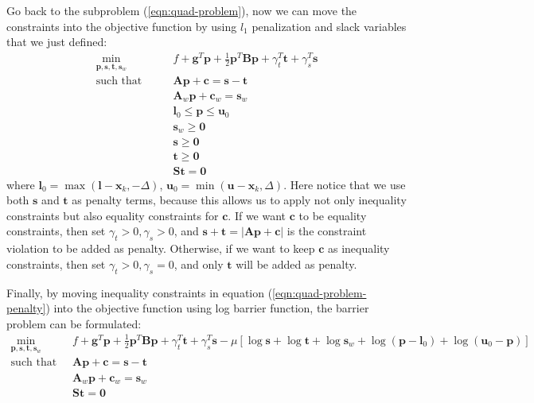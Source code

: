 \documentclass[12pt]{article}
\newcommand{\mb}{\mathbf}
\begin{document}
Go back to the subproblem (\ref{eqn:quad-problem}), now we can move the constraints into the objective function by using $l_1$ penalization and slack variables that we just defined:
%
\begin{equation}
  \label{eqn:quad-problem-penalty}
  \begin{aligned}
    \min_{\mb{p}, \mb{s}, \mb{t}, \mb{s}_w} \qquad & f + \mb{g}^T\mb{p} + \frac{1}{2}\mb{p}^T\mb{B}\mb{p} + \gamma_t^T\mb{t} + \gamma_s^T\mb{s}\\
    \text{such that} \qquad
    & \mb{A}\mb{p} + \mb{c} = \mb{s} - \mb{t} \\
    & \mb{A}_{w}\mb{p} + \mb{c}_{w} = \mb{s}_w \\
    & \mb{l}_0 \le \mb{p} \le \mb{u}_0 \\
    & \mb{s}_w \ge \mb{0} \\
    & \mb{s} \ge \mb{0} \\
    & \mb{t} \ge \mb{0} \\
    & \mb{S} \mb{t} = \mb{0}
  \end{aligned}
\end{equation}
%
where $\mb{l}_0 = \max(\mb{l} - \mb{x}_k, -\Delta)$, $\mb{u}_0 = \min(\mb{u} - \mb{x}_k, \Delta)$. Here notice that we use both $\mb{s}$ and $\mb{t}$ as penalty terms, because this allows us to apply not only inequality constraints but also equality constraints for $\mb{c}$. If we want $\mb{c}$ to be equality constraints, then set $\gamma_t > 0, \gamma_s > 0$, and $\mb{s} + \mb{t} = |\mb{A}\mb{p} + \mb{c}|$ is the constraint violation to be added as penalty. Otherwise, if we want to keep $\mb{c}$ as inequality constraints, then set $\gamma_t > 0, \gamma_s = 0$, and only $\mb{t}$ will be added as penalty.

Finally, by moving inequality constraints in equation (\ref{eqn:quad-problem-penalty}) into the objective function using log barrier function, the barrier problem can be formulated:
%
\begin{equation}
  \label{eqn:quad-problem-barrier}
  \begin{aligned}
    \min_{\mb{p}, \mb{s}, \mb{t}, \mb{s}_w} \qquad & f + \mb{g}^T\mb{p} + \frac{1}{2}\mb{p}^T\mb{B}\mb{p} + \gamma_t^T\mb{t} + \gamma_s^T\mb{s} - \mu \left[ \log \mb{s} + \log \mb{t} + \log \mb{s}_{w} + \log (\mb{p} - \mb{l}_0) + \log (\mb{u}_0 - \mb{p})  \right] \\
    \text{such that} \qquad
    & \mb{A}\mb{p} + \mb{c} = \mb{s} - \mb{t} \\
    & \mb{A}_{w}\mb{p} + \mb{c}_{w} = \mb{s}_w \\
    & \mb{S} \mb{t} = \mb{0}
  \end{aligned}
\end{equation}
\end{document}
